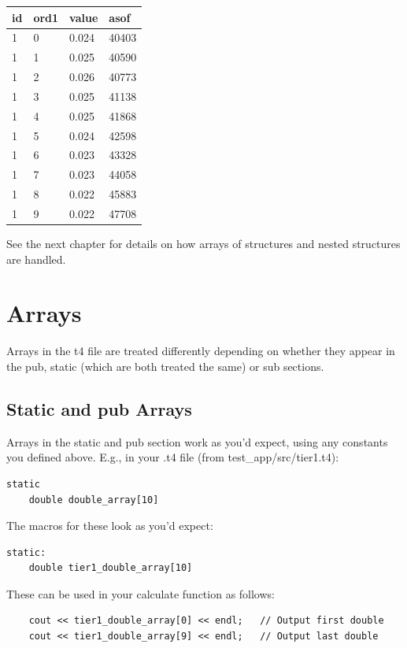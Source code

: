 \documentclass{report}
\begin{document}
\begin {tabular} {| l | l | l | l |}
\hline
id & ord1 & value & asof \\
\hline
1 & 0 & 0.024 & 40403 \\
\hline
1 & 1 & 0.025 & 40590 \\
\hline
1 & 2 & 0.026 & 40773 \\
\hline
1 & 3 & 0.025 & 41138 \\
\hline
1 & 4 & 0.025 & 41868 \\
\hline
1 & 5 & 0.024 & 42598 \\
\hline
1 & 6 & 0.023 & 43328 \\
\hline
1 & 7 & 0.023 & 44058 \\
\hline
1 & 8 & 0.022 & 45883 \\
\hline
1 & 9 & 0.022 & 47708 \\
\hline
\end {tabular}

See the next chapter for details on how arrays of structures and nested structures are handled.




\section{Arrays}

Arrays in the t4 file are treated differently depending on whether they appear in the pub, static (which are both treated the same) or sub sections. 

\subsection{Static and pub Arrays}

Arrays in the static and pub section work as you'd expect, using any constants you defined above. E.g., in your .t4 file (from test_app/src/tier1.t4):

\begin{verbatim}
static
    double double_array[10]
\end{verbatim}

The macros for these look as you'd expect:

\begin{verbatim}
static:
    double tier1_double_array[10]
\end{verbatim}

These can be used in your calculate function as follows:

\begin{verbatim}
    cout << tier1_double_array[0] << endl;   // Output first double
    cout << tier1_double_array[9] << endl;   // Output last double
\end{verbatim}
\end{document}
